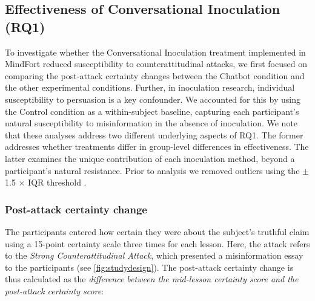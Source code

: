 \documentclass[sigconf]{acmart}
\begin{document}


\subsection{Effectiveness of Conversational Inoculation (RQ1)}

To investigate whether the Conversational Inoculation treatment implemented in MindFort reduced susceptibility to counterattitudinal attacks, we first focused on comparing the post-attack certainty changes between the Chatbot condition and the other experimental conditions.
Further, in inoculation research, individual susceptibility to persuasion is a key confounder. 
We 
accounted for this by using the Control condition as a within-subject baseline, capturing each participant's natural susceptibility to misinformation in the absence of inoculation.
We note that these analyses address two different underlying aspects of RQ1.
The former addresses whether treatments differ in group-level differences in effectiveness.
The latter examines the unique contribution of each inoculation method, beyond a participant's natural resistance.
Prior to analysis we removed outliers using the $\pm$1.5 × IQR threshold \cite{tukey1977exploratory}.

\subsubsection{Post-attack certainty change}
\label{sec:rq1_apriori}
The participants entered how certain they were about the subject's truthful claim using a 15-point certainty scale three times for each lesson. 
Here, the attack refers to the \textit{Strong Counterattitudinal Attack}, which presented a misinformation essay to the participants (see \autoref{fig:studydesign}).
The post-attack certainty change is thus calculated as the \textit{difference between the mid-lesson certainty score and the post-attack certainty score}:
\end{document}
